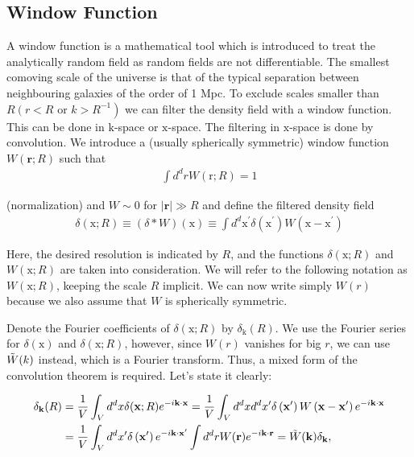 \begin{appendices}


\chapter{Window Function}\label{Window function}
A window function is a mathematical tool which is introduced to treat the analytically random field as random fields are not differentiable.
The smallest comoving scale of the universe is that of the typical separation between neighbouring galaxies of the order of 1 Mpc.
To exclude scales smaller than $R\left(r<R\right.$ or $\left. k>R^{-1}\right)$ we can filter the density field with a window function. This can be done in $\mathrm{k}$-space or $\mathrm{x}$-space.
The filtering in $\mathrm{x}$-space is done by convolution. We introduce a (usually spherically symmetric) window function $W(\mathbf{r} ; R)$ such that
\begin{align}
   \int d^d r W(\mathrm{r} ; R)=1 \label{c1}
\end{align}

(normalization) and $W \sim 0$ for $|\mathbf{r}| \gg R$ and define the filtered density field
\begin{align}
    \delta(\mathrm{x} ; R) \equiv(\delta * W)(\mathrm{x}) \equiv \int d^d \mathrm{x}^{\prime} \delta\left(\mathrm{x}^{\prime}\right) W\left(\mathrm{x}-\mathrm{x}^{\prime}\right)
\end{align}

Here, the desired resolution is indicated by $R$, and the functions $\delta(\mathrm{x}; R)$ and $W(\mathrm{x}; R)$ are taken into consideration. We will refer to the following notation as $W(\mathrm{x}; R)$, keeping the scale $R$ implicit. We can now write simply $W(r)$ because we also assume that $W$ is spherically symmetric.

Denote the Fourier coefficients of $\delta(\mathrm{x} ; R)$ by $\delta_{\mathrm{k}}(R)$. We use the Fourier series for $\delta(\mathrm{x})$ and $\delta(\mathrm{x}; R)$, however, since $W(r)$ vanishes for big $r$, we can use $ \Tilde{W}(k)$ instead, which is a Fourier transform. Thus, a mixed form of the convolution theorem is required. Let's state it clearly:

\begin{align}
    \delta_{\mathbf{k}}(R) & =\frac{1}{V} \int_V d^d x \delta(\mathbf{x} ; R) e^{-i \mathbf{k} \cdot \mathbf{x}}=\frac{1}{V} \int_V d^d x d^d x^{\prime} \delta\left(\mathbf{x}^{\prime}\right) W\left(\mathbf{x}-\mathbf{x}^{\prime}\right) e^{-i \mathbf{k} \cdot \mathbf{x}} \\
    & =\frac{1}{V} \int_V d^d x^{\prime} \delta\left(\mathbf{x}^{\prime}\right) e^{-i \mathbf{k} \cdot \mathbf{x}^{\prime}} \int d^d r W(\mathbf{r}) e^{-i \mathbf{k} \cdot \mathbf{r}}=\Tilde{W}(\mathbf{k}) \delta_{\mathbf{k}},
\end{align}


\end{appendices}
